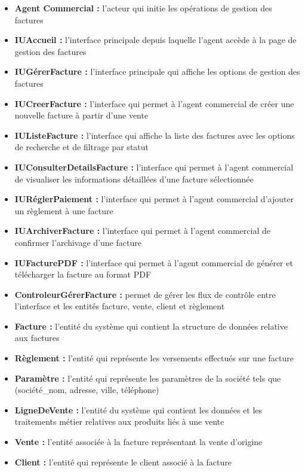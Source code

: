 \begin{itemize}[leftmargin=2em, topsep=4pt, itemsep=4pt]
  \item \textbf{Agent Commercial :} l'acteur qui initie les opérations de gestion des factures
  \item \textbf{IUAccueil :} l'interface principale depuis laquelle l'agent accède à la page de gestion des factures
  \item \textbf{IUGérerFacture :} l'interface principale qui affiche les options de gestion des factures
  \item \textbf{IUCreerFacture :} l'interface qui permet à l'agent commercial de créer une nouvelle facture à partir d'une vente
  \item \textbf{IUListeFacture :} l'interface qui affiche la liste des factures avec les options de recherche et de filtrage par statut
  \item \textbf{IUConsulterDetailsFacture :} l'interface qui permet à l'agent commercial de visualiser les informations détaillées d'une facture sélectionnée
  \item \textbf{IURéglerPaiement :} l'interface qui permet à l'agent commercial d'ajouter un règlement à une facture
  \item \textbf{IUArchiverFacture :} l'interface qui permet à l'agent commercial de confirmer l'archivage d'une facture
  \item \textbf{IUFacturePDF :} l'interface qui permet à l'agent commercial de générer et télécharger la facture au format PDF
  \item \textbf{ControleurGérerFacture :} permet de gérer les flux de contrôle entre l'interface et les entités facture, vente, client et règlement
  \item \textbf{Facture :} l'entité du système qui contient la structure de données relative aux factures
  \item \textbf{Règlement :} l'entité qui représente les versements effectués sur une facture
  \item \textbf{Paramètre :} l'entité qui représente les paramètres de la société tels que (société\_nom, adresse, ville, téléphone)
  \item \textbf{LigneDeVente :} l'entité du système qui contient les données et les traitements métier relatives aux produits liés à une vente
  \item \textbf{Vente :} l'entité associée à la facture représentant la vente d'origine
  \item \textbf{Client :} l'entité qui représente le client associé à la facture
\end{itemize}

